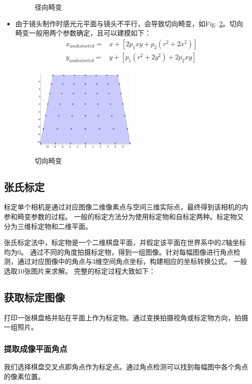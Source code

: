 \documentclass[10pt,a4paper]{article}
\begin{document}
\begin{CJK*}{UTF8}{gbsn}
\begin{itemize}
\begin{figure}[htbp]
            \caption{径向畸变}
            \label{fig:dis1}
        \end{figure}
    \item
        由于镜头制作时感光元平面与镜头不平行，会导致切向畸变，如Fig. \ref{fig:dis2}。切向畸变一般用两个参数确定，且可以建模如下：
        \begin{equation}
            \label{eq:dis2}
            \begin{aligned}
                x_{undistorted} =& x + [ 2p_1xy + p_2(r^2+2x^2)] \\ 
                y_{undistorted} =& y + [ p_1(r^2+ 2y^2)+ 2p_2xy]
            \end{aligned}
        \end{equation}
        \begin{figure}[htbp]
            \centering
            \includegraphics[height=4.5cm,width=5.5cm]{5.png}
            \caption{切向畸变}
            \label{fig:dis2}
        \end{figure}
\end{itemize}



\subsection{张氏标定}
标定单个相机是通过对应图像二维像素点与空间三维实际点，最终得到该相机的内参和畸变参数的过程。
一般的标定方法分为使用标定物和自标定两种。标定物又分为三维标定物和二维平面。

张氏标定法中，标定物是一个二维棋盘平面，并假定该平面在世界系中的$Z$轴坐标均为0。
通过不同的角度拍摄标定物，得到一组图像。针对每幅图像进行角点检测，通过对应图像中的角点与3维空间角点坐标，构建相应的坐标转换公式。
一般选取10张图片来求解。
完整的标定过程大致如下：
\subsection{获取标定图像}
打印一张棋盘格并贴在平面上作为标定物。通过变换拍摄视角或标定物方向，拍摄一组照片。
\subsubsection{提取成像平面角点}
我们选择棋盘交叉点即角点作为标定点。通过角点检测可以找到每幅图中各个角点的像素位置。

\end{CJK*}
\end{document}
